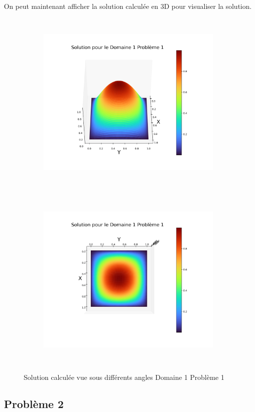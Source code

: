 \documentclass[a4paper, 12pt, french]{report}
\begin{document}
On peut maintenant afficher la solution calculée en 3D pour visualiser la solution.
\begin{figure}[!h]
    \centering
    \begin{subfigure}{0.48\textwidth}
    	\centering
        \includegraphics[height=9cm]{../Images/Figures_Calculees/sol3D11.png}
    \end{subfigure}
    \begin{subfigure}{0.48\textwidth}
    \centering
        \includegraphics[height=9cm]{../Images/Figures_Calculees/sol3DVH11.png}
    \end{subfigure}
    \caption{Solution calculée vue sous différents angles Domaine 1 Problème 1 }
\end{figure}
\subsection{Problème 2}
\end{document}
